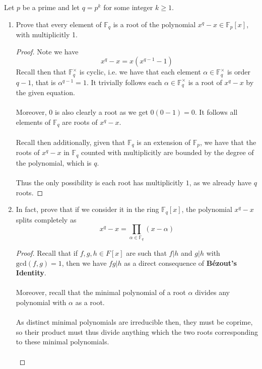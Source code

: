 \documentclass[12pt]{article}
\newenvironment{ex}[2][Exercise]{\begin{trivlist}
\item[\hskip \labelsep {\bfseries #1}\hskip \labelsep {\bfseries #2.}]}{\end{trivlist}}
\begin{document}
\begin{ex}{3}
    Let $p$ be a prime and let $q = p^k$ for some integer $k \geq 1$. 
    \begin{enumerate}[label=(\alph*)]
        \item Prove that every element of $\mathbb{F}_q$ is a root of the polynomial $x^q - x \in \mathbb{F}_p[x]$, with multiplicitly 1.
        \begin{proof}
            Note we have 
            $$x^q - x = x(x^{q -1} - 1)$$
            Recall then that $\mathbb{F}_q^\times$ is cyclic, i.e. we have that each element $\alpha \in \mathbb{F}_q^\times$ is order $q - 1$, that is $\alpha^{q - 1} = 1$. It trivially follows each $\alpha \in \mathbb{F}_q^\times$ is a root of $x^q - x$ by the given equation. \\ \\
            Moreover, $0$ is also clearly a root as we get $0(0 - 1) = 0$. It follows all elements of $\mathbb{F}_q$ are roots of $x^q - x$. \\ \\
            Recall then additionally, given that $\mathbb{F}_q$ is an extension of $\mathbb{F}_p$, we have that the roots of $x^q - x$ in $\mathbb{F}_q$ counted with multiplicitly are bounded by the degree of the polynomial, which is $q$. \\ \\Thus the only possibility is each root has multiplicitly $1$, as we already have $q$ roots.
        \end{proof}
        \item In fact, prove that if we consider it in the ring $\mathbb{F}_q[x]$, the polynomial $x^q - x$ splits completely as 
        $$x^q - x = \prod_{\alpha \in \mathbb{F}_q} (x - \alpha)$$
        \begin{proof} 
            Recall that if $f, g, h \in F[x]$ are such that $f | h$ and $g | h$ with $\text{gcd}(f,g) = 1$, then we have $fg | h$ as a direct consequence of \textbf{B\'ezout's Identity}. \\ \\
            Moreover, recall that the minimal polynomial of a root $\alpha$ divides any polynomial with $\alpha$ as a root. \\ \\ As distinct minimal polynomials are irreducible then, they must be coprime, so their product must thus divide anything which the two roots corresponding to these minimal polynomials. \\ \\

\end{proof}
\end{enumerate}
\end{ex}
\end{document}
